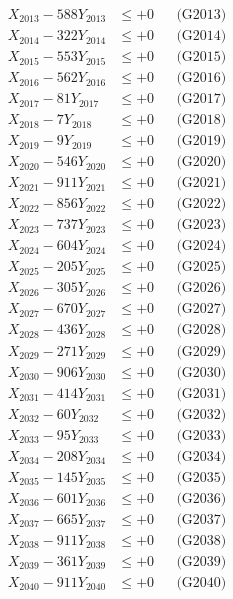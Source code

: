 \documentclass[a4paper,10pt]{article}
\begin{document}
{\begin{align}
X_{2013} - 588Y_{2013} &\leq +0 && \text{(G2013)} \\
X_{2014} - 322Y_{2014} &\leq +0 && \text{(G2014)} \\
X_{2015} - 553Y_{2015} &\leq +0 && \text{(G2015)} \\
X_{2016} - 562Y_{2016} &\leq +0 && \text{(G2016)} \\
X_{2017} - 81Y_{2017} &\leq +0 && \text{(G2017)} \\
X_{2018} - 7Y_{2018} &\leq +0 && \text{(G2018)} \\
X_{2019} - 9Y_{2019} &\leq +0 && \text{(G2019)} \\
X_{2020} - 546Y_{2020} &\leq +0 && \text{(G2020)} \\
\allowbreak
X_{2021} - 911Y_{2021} &\leq +0 && \text{(G2021)} \\
X_{2022} - 856Y_{2022} &\leq +0 && \text{(G2022)} \\
X_{2023} - 737Y_{2023} &\leq +0 && \text{(G2023)} \\
X_{2024} - 604Y_{2024} &\leq +0 && \text{(G2024)} \\
X_{2025} - 205Y_{2025} &\leq +0 && \text{(G2025)} \\
X_{2026} - 305Y_{2026} &\leq +0 && \text{(G2026)} \\
X_{2027} - 670Y_{2027} &\leq +0 && \text{(G2027)} \\
X_{2028} - 436Y_{2028} &\leq +0 && \text{(G2028)} \\
X_{2029} - 271Y_{2029} &\leq +0 && \text{(G2029)} \\
X_{2030} - 906Y_{2030} &\leq +0 && \text{(G2030)} \\
\allowbreak
X_{2031} - 414Y_{2031} &\leq +0 && \text{(G2031)} \\
X_{2032} - 60Y_{2032} &\leq +0 && \text{(G2032)} \\
X_{2033} - 95Y_{2033} &\leq +0 && \text{(G2033)} \\
X_{2034} - 208Y_{2034} &\leq +0 && \text{(G2034)} \\
X_{2035} - 145Y_{2035} &\leq +0 && \text{(G2035)} \\
X_{2036} - 601Y_{2036} &\leq +0 && \text{(G2036)} \\
X_{2037} - 665Y_{2037} &\leq +0 && \text{(G2037)} \\
X_{2038} - 911Y_{2038} &\leq +0 && \text{(G2038)} \\
X_{2039} - 361Y_{2039} &\leq +0 && \text{(G2039)} \\
X_{2040} - 911Y_{2040} &\leq +0 && \text{(G2040)} \\

\end{align}}
\end{document}

